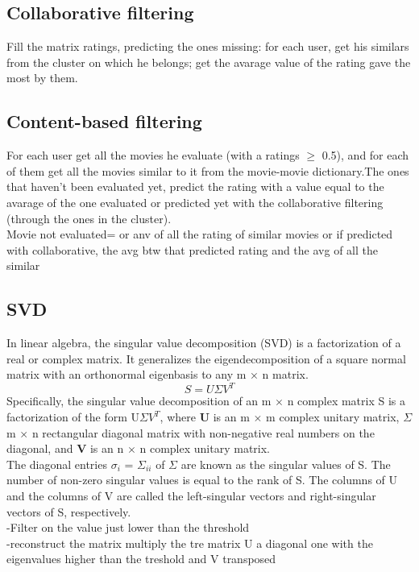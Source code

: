 \documentclass{article}
\begin{document}
\subsection{Collaborative filtering}
Fill the matrix ratings, predicting the ones missing: for each user, get his similars from the cluster on which he belongs; get the avarage value of the rating gave the most by them.
\subsection{Content-based filtering}
For each user get all the movies he evaluate (with a ratings $\ge$ 0.5), and for each of them get all the movies similar to it from the movie-movie dictionary.The ones that haven't been evaluated yet, predict the rating with a value equal to the avarage of the one evaluated or predicted yet with the collaborative filtering (through the ones in the cluster).\\
Movie not evaluated= or anv of all the rating of similar movies
or if predicted with collaborative, the avg btw that predicted rating and the avg of all the similar 
\subsection{SVD}
In linear algebra, the singular value decomposition (SVD) is a factorization of a real or complex matrix. It generalizes the eigendecomposition of a square normal matrix with an orthonormal eigenbasis to any m × n matrix.
\begin{equation}
      S = U\Sigma V^T
\end{equation}
Specifically, the singular value decomposition of an m $\times$ n complex matrix S is a factorization of the form U$\Sigma V^T$, where \textbf{U} is an m $\times$ m complex unitary matrix, \textbf{$\Sigma$} m $\times$ n rectangular diagonal matrix with non-negative real numbers on the diagonal, and \textbf{V} is an n $\times$ n complex unitary matrix.\\
The diagonal entries $\sigma _{i}$ = $\Sigma _{ii}$ of $\Sigma$ are known as the singular values of S. The number of non-zero singular values is equal to the rank of S. The columns of U and the columns of V are called the left-singular vectors and right-singular vectors of S, respectively.\\
-Filter on the value just lower than the threshold\\
-reconstruct the matrix multiply the tre matrix U a diagonal one with the \\eigenvalues higher than the treshold and V transposed\\
\end{document}

